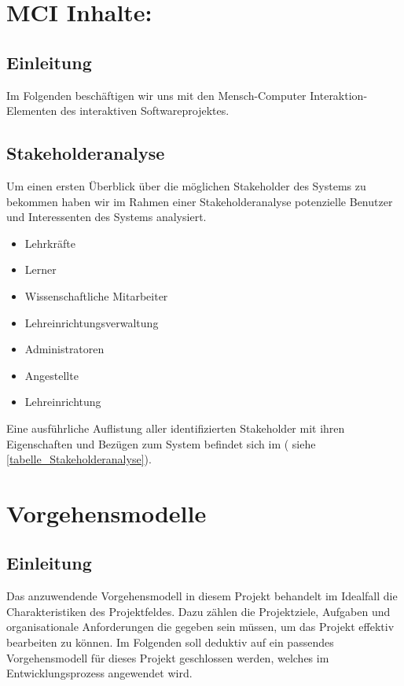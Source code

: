 \section{MCI Inhalte:}
\label{sec:MCI Inhalte}

\subsection{Einleitung}
\label{sec:Einleitung}

Im Folgenden beschäftigen wir uns mit den Mensch-Computer Interaktion-Elementen
des interaktiven Softwareprojektes.

\subsection{Stakeholderanalyse}
\label{sec:Stakeholderanalyse}

Um einen ersten Überblick über die möglichen Stakeholder des Systems zu bekommen
haben wir im Rahmen einer Stakeholderanalyse potenzielle Benutzer und 
Interessenten des Systems analysiert. 
\begin{itemize}
	\item Lehrkräfte
	\item Lerner
	\item Wissenschaftliche Mitarbeiter
	\item Lehreinrichtungsverwaltung
	\item Administratoren
	\item Angestellte
	\item Lehreinrichtung
\end{itemize}

Eine ausführliche Auflistung aller identifizierten Stakeholder mit ihren
Eigenschaften und Bezügen zum System befindet sich im ( siehe \ref{tabelle_Stakeholderanalyse}).

\section{Vorgehensmodelle}
\label{sec:Vorgehensmodelle}

\subsection{Einleitung}
\label{sec:Vorgehensmodelle_Einleitung}

Das anzuwendende Vorgehensmodell in diesem Projekt behandelt im Idealfall
die Charakteristiken des Projektfeldes. Dazu zählen \zB die Projektziele,
Aufgaben und organisationale Anforderungen die gegeben sein müssen, um das
Projekt effektiv bearbeiten zu können. Im Folgenden soll deduktiv auf ein
passendes Vorgehensmodell für dieses Projekt geschlossen werden, welches im
Entwicklungsprozess angewendet wird.

